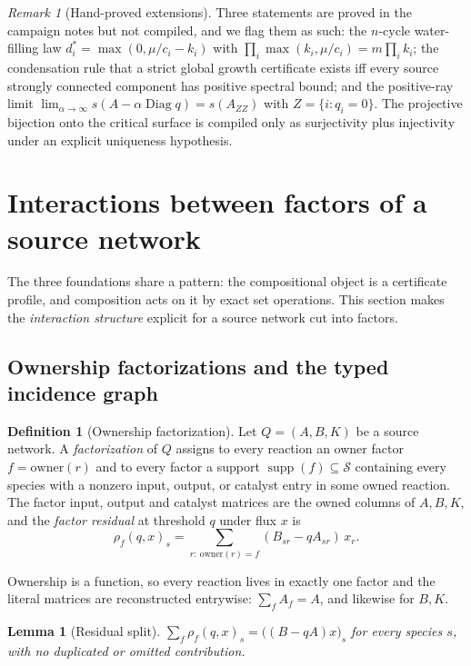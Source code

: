 \documentclass[11pt,a4paper]{article}
\theoremstyle{plain}
\newtheorem{lemma}[theorem]{Lemma}
\theoremstyle{definition}
\newtheorem{definition}[theorem]{Definition}
\theoremstyle{remark}
\newtheorem{remark}[theorem]{Remark}
\newcommand{\Diag}{\operatorname{Diag}}
\newcommand{\spb}{s}
\begin{document}
\begin{remark}[Hand-proved extensions]\label{rem:hand-deg}
Three statements are proved in the campaign notes but not compiled, and we flag them as such: the $n$-cycle water-filling law $d_i^*=\max(0,\mu/c_i-k_i)$ with $\prod_i\max(k_i,\mu/c_i)=m\prod_ik_i$; the condensation rule that a strict global growth certificate exists iff every source strongly connected component has positive spectral bound; and the positive-ray limit $\lim_{\alpha\to\infty}\spb(A-\alpha\Diag q)=\spb(A_{ZZ})$ with $Z=\{i:q_i=0\}$. The projective bijection onto the critical surface is compiled only as surjectivity plus injectivity under an explicit uniqueness hypothesis.
\end{remark}

\section{Interactions between factors of a source network}\label{sec:cic}

The three foundations share a pattern: the compositional object is a certificate profile, and composition acts on it by exact set operations. This section makes the \emph{interaction structure} explicit for a source network cut into factors.

\subsection{Ownership factorizations and the typed incidence graph}

\begin{definition}[Ownership factorization]
Let $Q=(A,B,K)$ be a source network. A \emph{factorization} of $Q$ assigns to every reaction an owner factor $f=\mathrm{owner}(r)$ and to every factor a support $\operatorname{supp}(f)\subseteq\mathcal S$ containing every species with a nonzero input, output, or catalyst entry in some owned reaction. The factor input, output and catalyst matrices are the owned columns of $A,B,K$, and the \emph{factor residual} at threshold $q$ under flux $x$ is
\[
\rho_f(q,x)_s=\sum_{r:\ \mathrm{owner}(r)=f}(B_{sr}-qA_{sr})\,x_r .
\]
\end{definition}

Ownership is a function, so every reaction lives in exactly one factor and the literal matrices are reconstructed entrywise: $\sum_f A_f=A$, and likewise for $B,K$.

\begin{lemma}[Residual split]\label{lem:split}
$\sum_f\rho_f(q,x)_s=\big((B-qA)x\big)_s$ for every species $s$, with no duplicated or omitted contribution.
\end{lemma}
\end{document}
